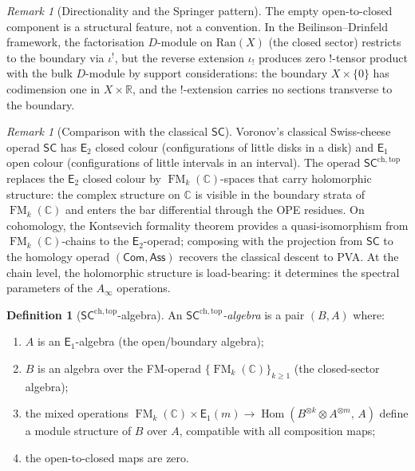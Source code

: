 \documentclass[11pt,reqno]{amsart}
\theoremstyle{definition}
\newtheorem{definition}[theorem]{Definition}
\theoremstyle{remark}
\newtheorem{remark}[theorem]{Remark}
\newcommand{\CC}{\mathbb{C}}
\newcommand{\RR}{\mathbb{R}}
\newcommand{\Ran}{\mathrm{Ran}}
\newcommand{\Ainf}{A_{\infty}}
\newcommand{\Eone}{\mathsf{E}_{1}}
\newcommand{\Etwo}{\mathsf{E}_{2}}
\newcommand{\SC}{\mathsf{SC}}
\newcommand{\SCchtop}{\mathsf{SC}^{\mathrm{ch,top}}}
\newcommand{\Ass}{\mathsf{Ass}}
\newcommand{\Com}{\mathsf{Com}}
\DeclareMathOperator{\Hom}{Hom}
\DeclareMathOperator{\FM}{FM}
\numberwithin{equation}{section}
\begin{document}
\begin{remark}[Directionality and the Springer pattern]
\label{rem:directionality}
The empty open-to-closed component is a structural feature,
not a convention.  In the Beilinson--Drinfeld framework, the
factorisation $D$-module on $\Ran(X)$ (the closed sector)
restricts to the boundary via $\iota^!$, but the reverse
extension $\iota_!$ produces zero $!$-tensor product with the
bulk $D$-module by support considerations: the boundary
$X \times \{0\}$ has codimension one in $X \times \RR$, and
the $!$-extension carries no sections transverse to the
boundary.
\end{remark}

\begin{remark}[Comparison with the classical $\SC$]
\label{rem:classical-SC}
Voronov's classical Swiss-cheese operad $\SC$ has $\Etwo$ closed
colour (configurations of little disks in a disk) and $\Eone$
open colour (configurations of little intervals in an interval).
The operad $\SCchtop$ replaces the $\Etwo$ closed colour by
$\FM_k(\CC)$-spaces that carry holomorphic structure: the complex
structure on $\CC$ is visible in the boundary strata of
$\FM_k(\CC)$ and enters the bar differential through the OPE
residues.  On cohomology, the Kontsevich formality theorem
provides a quasi-isomorphism from $\FM_k(\CC)$-chains to the
$\Etwo$-operad; composing with the projection from $\SC$ to the
homology operad $(\Com, \Ass)$ recovers the classical descent to
PVA\@.  At the chain level, the holomorphic structure is load-bearing:
it determines the spectral parameters of the $\Ainf$ operations.
\end{remark}

\begin{definition}[$\SCchtop$-algebra]
\label{def:SC-algebra}
An \emph{$\SCchtop$-algebra} is a pair $(B, A)$ where:
\begin{enumerate}[label=(\roman*)]
\item $A$ is an $\Eone$-algebra (the open/boundary algebra);
\item $B$ is an algebra over the FM-operad
  $\{\FM_k(\CC)\}_{k \geq 1}$ (the closed-sector algebra);
\item the mixed operations
  $\FM_k(\CC) \times \Eone(m) \to
  \Hom(B^{\otimes k} \otimes A^{\otimes m},\, A)$
  define a module structure of $B$ over $A$, compatible with
  all composition maps;
\item the open-to-closed maps are zero.
\end{enumerate}
\end{definition}
\end{document}
